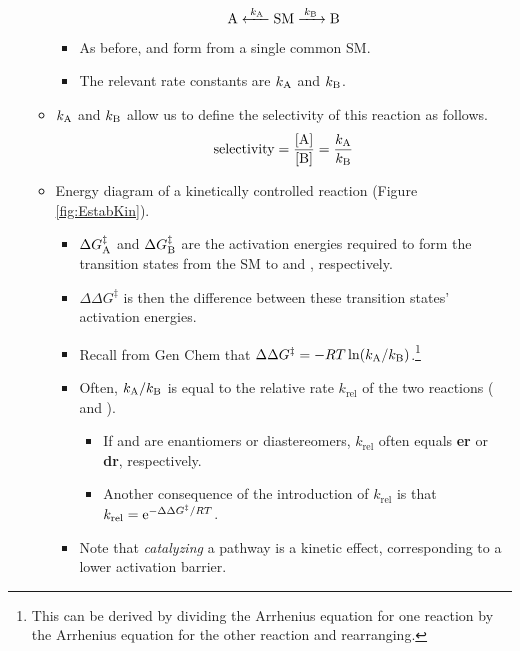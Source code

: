 \documentclass[../notes.tex]{subfiles}
\begin{document}
\begin{itemize}
\begin{itemize}
\begin{equation*}
            \ce{A <-[$k_{\ce{A}}$] SM ->[$k_{\ce{B}}$] B}
        \end{equation*}
        \begin{itemize}
            \item As before,  and  form from a single common SM.
            \item The relevant rate constants are $k_{\ce{A}}$ and $k_{\ce{B}}$.
        \end{itemize}
        \item $k_{\ce{A}}$ and $k_{\ce{B}}$ allow us to define the selectivity of this reaction as follows.
        \begin{equation*}
            \text{selectivity} = \frac{\cnc{A}}{\cnc{B}}
            = \frac{k_{\ce{A}}}{k_{\ce{B}}}
        \end{equation*}
        \item Energy diagram of a kinetically controlled reaction (Figure \ref{fig:EstabKin}).
        \begin{itemize}
            \item $\Delta G_{\ce{A}}^\ddagger$ and $\Delta G_{\ce{B}}^\ddagger$ are the activation energies required to form the transition states from the SM to  and , respectively.
            \item $\Delta\Delta G^\ddagger$ is then the difference between these transition states' activation energies.
            \item Recall from Gen Chem that $\Delta\Delta G^\ddagger=-RT\ln(k_{\ce{A}}/k_{\ce{B}})$.\footnote{This can be derived by dividing the Arrhenius equation for one reaction by the Arrhenius equation for the other reaction and rearranging.}
            \item Often, $k_{\ce{A}}/k_{\ce{B}}$ is equal to the relative rate $k_\text{rel}$ of the two reactions ( and ).
            \begin{itemize}
                \item If  and  are enantiomers or diastereomers, $k_\text{rel}$ often equals \textbf{er} or \textbf{dr}, respectively.
                \item Another consequence of the introduction of $k_\text{rel}$ is that $k_\text{rel}=\e[-\Delta\Delta G^\ddagger/RT]$.
            \end{itemize}
            \item Note that \emph{catalyzing} a pathway is a kinetic effect, corresponding to a lower activation barrier.
        \end{itemize}

\end{itemize}
\end{itemize}
\end{document}
